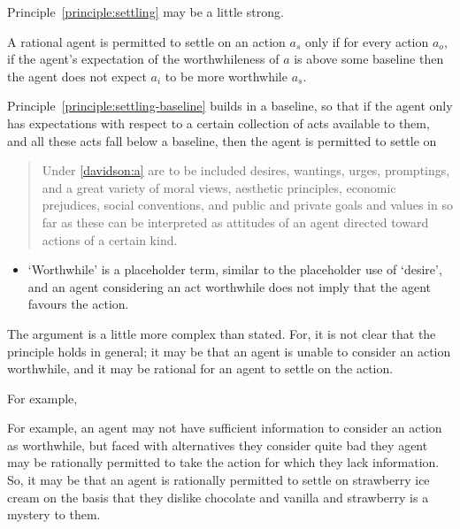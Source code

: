 \documentclass[10pt]{article}
\newcommand{\hozlinedash}[0]{%
  \noindent\hdashrule[0.5ex][c]{\textwidth}{.1pt}{2.5pt}
}
\begin{document}
Principle~\ref{principle:settling} may be a little strong.

\begin{principle}\label{principle:settling-baseline}
  A rational agent is permitted to settle on an action \(a_{s}\) only if for every action \(a_{o}\), if the agent's expectation of the worthwhileness of \(a\) is above some baseline then the agent does not expect \(a_{i}\) to be more worthwhile \(a_{s}\).
\end{principle}


Principle~\ref{principle:settling-baseline} builds in a baseline, so that if the agent only has expectations with respect to a certain collection of acts available to them, and all these acts fall below a baseline, then the agent is permitted to settle on 







\begin{quote}
  Under \ref{davidson:a} are to be included desires, wantings, urges, promptings, and a great variety of moral views, aesthetic principles, economic prejudices, social conventions, and public and private goals and values in so far as these can be interpreted as attitudes of an agent directed toward actions of a certain kind.
\end{quote}



\hozlinedash




\begin{itemize}
\item `Worthwhile' is a placeholder term, similar to the placeholder use of `desire', and an agent considering an act worthwhile does not imply that the agent favours the action.
\end{itemize}



The argument is a little more complex than stated.
For, it is not clear that the principle holds in general;
it may be that an agent is unable to consider an action worthwhile, and it may be rational for an agent to settle on the action.

For example, 

For example, an agent may not have sufficient information to consider an action as worthwhile, but faced with alternatives they consider quite bad they agent may be rationally permitted to take the action for which they lack information.
So, it may be that an agent is rationally permitted to settle on strawberry ice cream on the basis that they dislike chocolate and vanilla and strawberry is a mystery to them.
\end{document}
